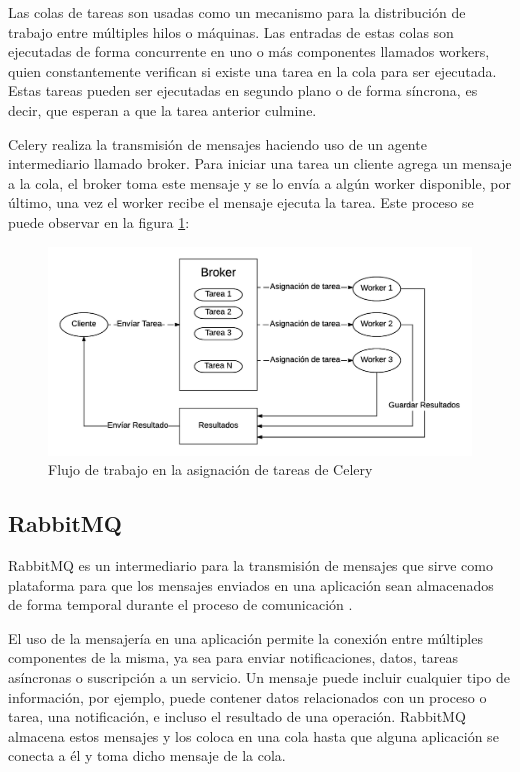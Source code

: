 Las colas de tareas son usadas como un mecanismo para la distribución de trabajo entre múltiples hilos o máquinas.
Las entradas de estas colas son ejecutadas de forma concurrente en uno o más componentes llamados workers, quien constantemente verifican si existe una tarea en la cola para ser ejecutada.
Estas tareas pueden ser ejecutadas en segundo plano o de forma síncrona, es decir, que esperan a que la tarea anterior culmine.

Celery realiza la transmisión de mensajes haciendo uso de un agente intermediario llamado broker.
Para iniciar una tarea un cliente agrega un mensaje a la cola, el broker toma este mensaje y se lo envía a algún worker disponible, por último, una vez el worker recibe el mensaje ejecuta la tarea.
Este proceso se puede observar en la figura \ref{fig:celery}:

\begin{figure}[H]
	\centering
		\includegraphics[width=.9\textwidth]{figures/celery}
	\caption{Flujo de trabajo en la asignación de tareas de Celery}
	\label{fig:celery}
\end{figure}

\subsection{RabbitMQ}

RabbitMQ es un intermediario para la transmisión de mensajes que sirve como plataforma para que los mensajes enviados
en una aplicación sean almacenados de forma temporal durante el proceso de comunicación \cite{14}.

El uso de la mensajería en una aplicación permite la conexión entre múltiples componentes de la misma, ya sea para enviar notificaciones, datos, tareas asíncronas o suscripción a un servicio.
Un mensaje puede incluir cualquier tipo de información, por ejemplo, puede contener datos relacionados con un proceso o tarea, una notificación, e incluso el resultado de una operación.
RabbitMQ almacena estos mensajes y los coloca en una cola hasta que alguna aplicación se conecta a él y toma dicho mensaje de la cola.

